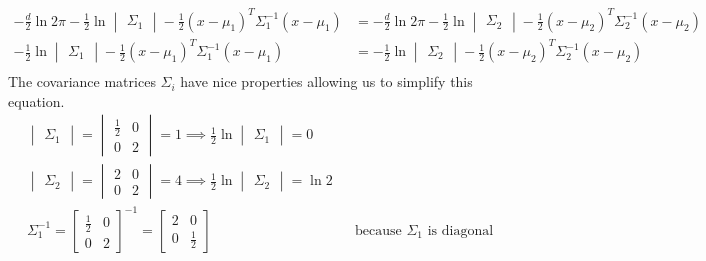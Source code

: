 \documentclass[a4paper, 10pt, twoside]{article}
\begin{document}
\begin{enumerate}[a)]
\begin{align*}
              -\frac{d}{2} \ln 2\pi - \frac{1}{2} \ln \begin{vmatrix}\Sigma_1\end{vmatrix} - \frac{1}{2}(x-\mu_1)^T \Sigma_1^{-1}(x-\mu_1) & = -\frac{d}{2} \ln 2\pi - \frac{1}{2} \ln \begin{vmatrix}\Sigma_2\end{vmatrix} - \frac{1}{2}(x-\mu_2)^T \Sigma_2^{-1}(x-\mu_2) \\
              - \frac{1}{2} \ln \begin{vmatrix}\Sigma_1\end{vmatrix} - \frac{1}{2}(x-\mu_1)^T \Sigma_1^{-1}(x-\mu_1)                       & = - \frac{1}{2} \ln \begin{vmatrix}\Sigma_2\end{vmatrix} - \frac{1}{2}(x-\mu_2)^T \Sigma_2^{-1}(x-\mu_2)                       \\
          \end{align*}
          The covariance matrices $\Sigma_i$ have nice properties allowing us to simplify this equation.
          \begin{align}
              \begin{vmatrix}\Sigma_1\end{vmatrix} = \begin{vmatrix}\frac{1}{2} & 0 \\ 0 & 2\end{vmatrix} = 1 \implies \frac{1}{2} \ln \begin{vmatrix}\Sigma_1\end{vmatrix} = 0            \\
              \begin{vmatrix}\Sigma_2\end{vmatrix} = \begin{vmatrix}2 & 0 \\ 0 & 2\end{vmatrix} = 4 \implies \frac{1}{2} \ln \begin{vmatrix}\Sigma_2\end{vmatrix} = \ln 2        \\
              \Sigma_1^{-1} = \begin{bmatrix}\frac{1}{2} & 0 \\ 0 & 2\end{bmatrix}^{-1} = \begin{bmatrix}2 & 0 \\ 0 & \frac{1}{2}\end{bmatrix} &  & \text{because } \Sigma_1 \text{ is diagonal} \\

\end{align}
\end{enumerate}
\end{document}
